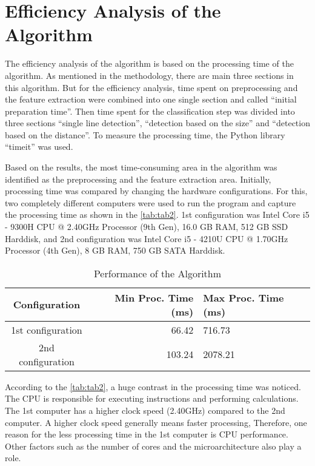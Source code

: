 \documentclass[]{iat}
\begin{document}
\section{Efficiency Analysis of the Algorithm}

The efficiency analysis of the algorithm is based on the processing time of the algorithm. As mentioned in the methodology, there are main three sections in this algorithm. But for the efficiency analysis, time spent on preprocessing and the feature extraction were combined into one single section and called “initial preparation time”. Then time spent for the classification step was divided into three sections “single line detection”, “detection based on the size” and “detection based on the distance”. To measure the processing time, the Python library “timeit” was used.
\par
Based on the results, the most time-consuming area in the algorithm was identified as the preprocessing and the feature extraction area. Initially, processing time was compared by changing the hardware configurations. For this, two completely different computers were used to run the program and capture the processing time as shown in the \autoref{tab:tab2}. 1st configuration was Intel Core i5 - 9300H CPU @ 2.40GHz Processor (9th Gen), 16.0 GB RAM, 512 GB SSD Harddisk, and 2nd configuration was Intel Core i5 - 4210U CPU @ 1.70GHz Processor (4th Gen), 8 GB RAM, 750 GB SATA Harddisk.
\par
\FloatBarrier
\begin{table}[h]
\begin{tabular}{crl}
\hline
Configuration & Min Proc. Time (ms) & Max Proc. Time (ms)\\\hline
1st configuration & 66.42  & 716.73 \\
2nd configuration & 103.24 & 2078.21 \\\hline
\end{tabular}
\caption{Performance of the Algorithm}
\label{tab:tab2}
\end{table}
According to the \autoref{tab:tab2}, a huge contrast in the processing time was noticed. The CPU is responsible for executing instructions and performing calculations. The 1st computer has a higher clock speed (2.40GHz) compared to the 2nd computer. A higher clock speed generally means faster processing, Therefore, one reason for the less processing time in the 1st computer is CPU performance. Other factors such as the number of cores and the microarchitecture also play a role. 
\par
\end{document}

